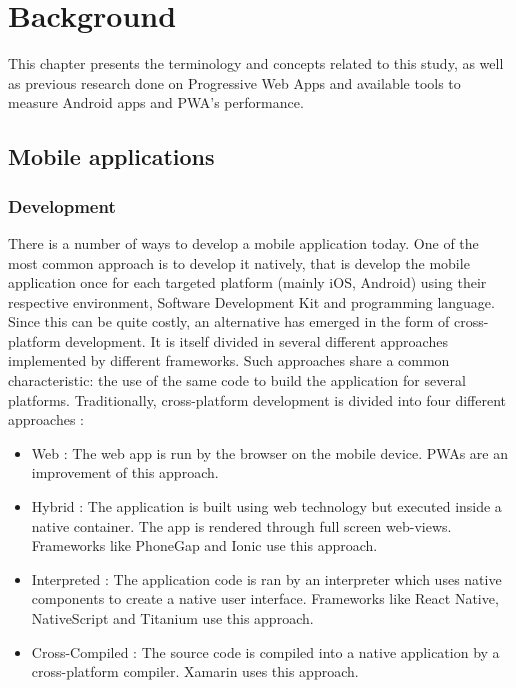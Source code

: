\documentclass{kththesis}
\begin{document}
\chapter{Background}

This chapter presents the terminology and concepts related to this study, as well as previous research done on Progressive Web Apps and available tools to measure Android apps and PWA's performance.  

\section{Mobile applications}
\subsection{Development}
There is a number of ways to develop a mobile application today. One of the most common approach is to develop it natively, that is develop the mobile application once for each targeted platform (mainly iOS, Android) using their respective environment, Software Development Kit and programming language. Since this can be quite costly, an alternative has emerged in the form of cross-platform development. It is itself divided in several different approaches implemented by different frameworks. Such approaches share a common characteristic: the use of the same code to build the application for several platforms. 
Traditionally, cross-platform development is divided into four different approaches \cite{CrossPlatform_dev} :
\begin{itemize}
    \item Web : The web app is run by the browser on the mobile device. PWAs are an improvement of this approach.
    \item Hybrid : The application is built using web technology but executed inside a native container. The app is rendered through full screen web-views. Frameworks like PhoneGap and Ionic \cite{crossplatform_approaches} use this approach.
    \item Interpreted : The application code is ran by an interpreter which uses native components to create a native user interface. Frameworks like React Native, NativeScript and Titanium \cite{emulating_native_w_crossplatform} use this approach.
    \item Cross-Compiled : The source code is compiled into a native application by a cross-platform compiler. Xamarin \cite{crossplatform_approaches} uses this approach. 
\end{itemize}
\end{document}
